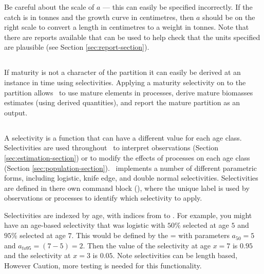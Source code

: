 Be careful about the scale of $a$ --- this can easily be specified incorrectly. If the catch is in tonnes and the growth curve in centimetres, then $a$ should be on the right scale to convert a length in centimetres to a weight in tonnes. Note that there are reports available that can be used to help check that the units specified are plausible (see Section \ref{sec:report-section}).

\subsubsection*{}

\subsection{\label{sec:weightless-model}}

\subsection{\label{sec:maturity-notinpartition}}

If maturity is not a character of the partition it can easily be derived at an instance in time using selectivities. Applying a maturity selectivity on to the partition allows \CNAME\ to use mature elements in processes, derive mature biomasses estimates (using derived quantities), and report the mature partition as an output.

\subsection{\label{sec:selectivities}}

A selectivity is a function that can have a different value for each age class. Selectivities are used throughout \CNAME\ to interpret observations (Section \ref{sec:estimation-section}) or to modify the effects of processes on each age class (Section \ref{sec:population-section}). \CNAME\ implements a number of different parametric forms, including logistic, knife edge, and double normal selectivities. Selectivities are defined in there own command block (), where the unique label is used by observations or processes to identify which selectivity to apply.

Selectivities are indexed by age, with indices from  to . For example, you might have an age-based selectivity that was logistic with $50\%$ selected at age $5$ and $95\%$ selected at age $7$. This would be defined by the = with parameters $a_{50}=5$ and $a_{to95}=(7-5)=2$. Then the value of the selectivity at age $x=7$ is $0.95$ and the selectivity at $x=3$ is $0.05$. Note selectivities can be length based, However Caution, more testing is needed for this functionality.

